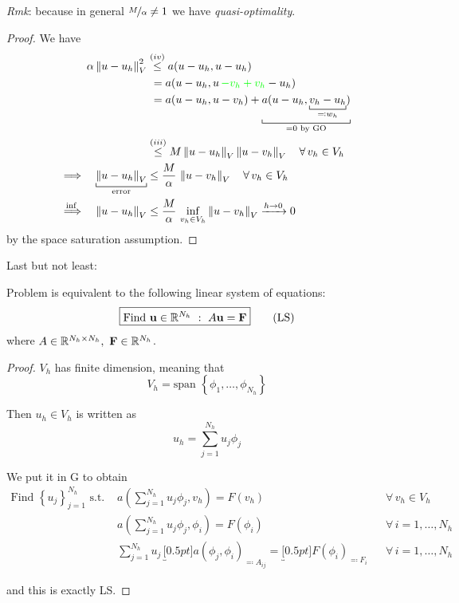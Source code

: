 \begin{itemize}
\emph{Rmk}: because in general $\nicefrac{M}{\alpha}\neq 1$ we have \emph{quasi-optimality}.

\begin{proof}
We have
\begin{align*}
\alpha\norm{u-u_h}_V^2&\overset{(iv)}{\leq} a(u-u_h,u-u_h) \\
&\,\,=a(u-u_h,u\,{\color{green}-v_h+v_h}-u_h) \\
&\,\,=a(u-u_h,u-v_h)+\underbracket[0.5pt]{a(u-u_h,\underbracket[0.5pt]{v_h-u_h}_{\eqcolon w_h})}_{=0\text{ by GO}} \\
&\overset{(iii)}{\leq} M \norm{u-u_h}_V \norm{u-v_h}_V\quad \forall\,v_h\in V_h \\
\Longrightarrow\quad \underbracket[0.5pt]{ \norm{u-u_h}_V }_{\text{error}}&\leq \frac{M}{\alpha}\,\norm{u-v_h}_V\quad\forall\,v_h\in V_h \\
\overset{\text{inf }}{\Longrightarrow}\quad \norm{u-u_h}_V &\leq \frac{M}{\alpha}\,\inf_{v_h\in V_h}\norm{u-v_h}_V \xrightarrow{h\to 0} 0
\end{align*}
by the space saturation assumption.
\end{proof}
\end{itemize}

Last but not least: 
\begin{theorem}
Problem {} is equivalent to the following linear system of equations:
\begin{equation*}
\boxed{\text{\normalfont Find } \mathbf{u}\in\mathbb{R}^{N_h}\ :\ A\mathbf{u}=\mathbf{F}}\tag{LS}
\end{equation*}
where $A\in\RR^{N_h\times N_h},\ \Fv\in\RR^{N_h}$.    
\end{theorem}\vspace{-0.5cm}

\begin{proof}
$V_h$ has finite dimension, meaning that
\begin{equation*}
V_h=\text{span }\left\{ \phi_1,\dots,\phi_{N_h} \right\}
\end{equation*}

Then $u_h\in V_h$ is written as
\begin{equation*}
u_h=\sum_{j=1}^{N_h} u_j\phi_j
\end{equation*}

We put it in G to obtain
\begin{align*}
\text{Find } \left\{ u_j \right\}_{j=1}^{N_h}\text{ s.t. } & a \left( \sum_{j=1}^{N_h} u_j\phi_j,v_h  \right)=F(v_h) && \forall\,v_h\in V_h \\
& a \left( \sum_{j=1}^{N_h} u_j\phi_j,\phi_i  \right)=F(\phi_i) && \forall\,i=1,\dots,N_h \\
& \sum_{j=1}^{N_h} u_j\, \underbracket[0.5pt]{a(\phi_j,\phi_i)}_{\eqcolon A_{ij}}=\underbracket[0.5pt]{F(\phi_i)}_{\eqcolon F_{i}} && \forall\,i=1,\dots,N_h
\end{align*}

and this is exactly LS.
\end{proof}


